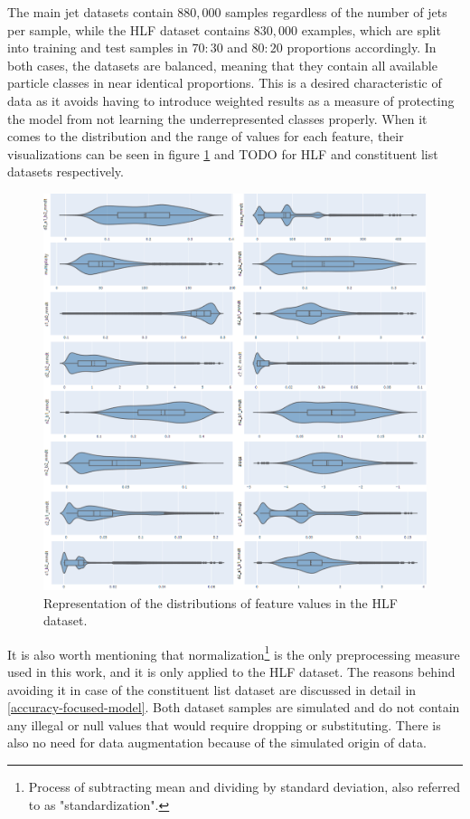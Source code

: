 The main jet datasets contain \(880,000\) samples regardless of the number of jets per sample, while the HLF dataset contains \(830,000\) examples, which are split into training and test samples in \(70:30\) and \(80:20\) proportions accordingly. In both cases, the datasets are balanced, meaning that they contain all available particle classes in near identical proportions. This is a desired characteristic of data as it avoids having to introduce weighted results as a measure of protecting the model from not learning the underrepresented classes properly. When it comes to the distribution and the range of values for each feature, their visualizations can be seen in figure \ref{fig:distributions-hlf} and TODO for HLF and constituent list datasets respectively.

\begin{figure}[hpt!]
  \centering
  \includegraphics[trim={0cm 0cm 0cm 0cm}, width=1.0\textwidth, center]{background/distributions.png}
  \caption{Representation of the distributions of feature values in the HLF dataset.}
  \label{fig:distributions-hlf}
\end{figure}

It is also worth mentioning that normalization\footnote{Process of subtracting mean and dividing by standard deviation, also referred to as "standardization".} is the only preprocessing measure used in this work, and it is only applied to the HLF dataset. The reasons behind avoiding it in case of the constituent list dataset are discussed in detail in \cref{accuracy-focused-model}. Both dataset samples are simulated and do not contain any illegal or null values that would require dropping or substituting. There is also no need for data augmentation because of the simulated origin of data.

\todofig{|}
\todofig{|}
\todofig{|}
\todofig{|}
\todofig{|}
\todofig{|}
\todofig{|}
